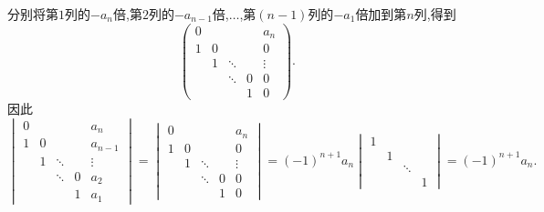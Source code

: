 \documentclass[11pt]{ctexart}
\theoremstyle{definition}
\numberwithin{equation}{section}
\begin{document}
\begin{aaa}
    分别将第$1$列的$-a_n$倍,第$2$列的$-a_{n-1}$倍,$\ldots$,第$(n-1)$列的$-a_1$倍加到第$n$列,得到\[\begin{pmatrix}
        0& & & &a_n\\1&0& & &0\\ & 1&\ddots& &\vdots\\ & &\ddots&0&0\\ & & &1&0
    \end{pmatrix}.\]
    因此
    \[\begin{vmatrix}
        0& & & &a_n\\1&0& & &a_{n-1}\\ & 1&\ddots& &\vdots\\ & &\ddots&0&a_2\\ & & &1&a_1
    \end{vmatrix}=\begin{vmatrix} 0& & & &a_n\\1&0& & &0\\ & 1&\ddots& &\vdots\\ & &\ddots&0&0\\ & & &1&0\end{vmatrix}=(-1)^{n+1}a_n\begin{vmatrix}1\\&1\\ &&\ddots\\&&&1\end{vmatrix}=(-1)^{n+1}a_n.\]
\end{aaa}

\newpage
\end{document}
